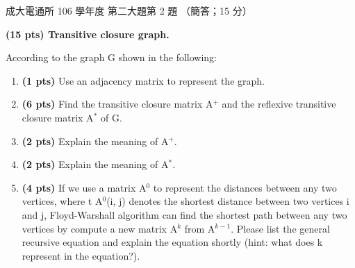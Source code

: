 \begin{pastexam}[label={px:ncku-106-cce-ds-06}]{成大電通所 106 學年度 第二大題第 2 題}
（簡答；15 分）

\textbf{(15 pts) Transitive closure graph.}

According to the graph G shown in the following:

\begin{center}
\end{center}
\begin{enumerate}[label=\alph*.]
\item \textbf{(1 pts)} Use an adjacency matrix to represent the graph.
\item \textbf{(6 pts)} Find the transitive closure matrix A$^+$ and the reflexive transitive closure
matrix A$^*$ of G.
\item \textbf{(2 pts)} Explain the meaning of A$^+$.
\item \textbf{(2 pts)} Explain the meaning of A$^*$.
\item \textbf{(4 pts)} If we use a matrix A$^0$ to represent the distances between any two
vertices, where t A$^0$(i, j) denotes the shortest distance between two vertices i and j,
Floyd-Warshall algorithm can find the shortest path between any two vertices by compute a new
matrix A$^k$ from A$^{k-1}$. Please list the general recursive equation and explain the equation
shortly (hint: what does k represent in the equation?).
\end{enumerate}
\end{pastexam}

